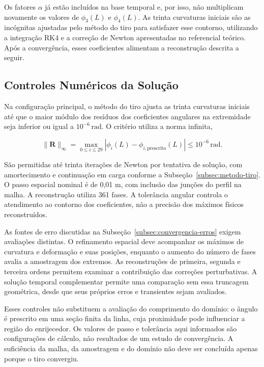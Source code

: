 \documentclass[arial,centeredequations,english,brazilian,oneside,section=TITLE]{ifes8}
\begin{document}
Os fatores $\alpha$ já estão incluídos na base temporal e, por isso, não
multiplicam novamente os valores de $\phi_3(L)$ e $\phi_4(L)$. As trinta
curvaturas iniciais são as incógnitas ajustadas pelo método do tiro para
satisfazer esse contorno, utilizando a integração RK4 e a correção de Newton
apresentadas no referencial teórico. Após a convergência, esses coeficientes
alimentam a reconstrução descrita a seguir.

\subsection{Controles Numéricos da Solução}
\label{sec:controles-numericos}

Na configuração principal, o método do tiro ajusta as trinta curvaturas iniciais
até que o maior módulo dos resíduos dos coeficientes angulares na extremidade
seja inferior ou igual a $10^{-6}\,\mathrm{rad}$. O critério utiliza a norma
infinita,

\begin{equation}
  \|\mathbf R\|_{\infty}=\max_{0\leq i\leq29}
    |\phi_i(L)-\phi_{i,\mathrm{prescrito}}(L)|
    \leq10^{-6}\,\mathrm{rad}.
  \label{eq:tolerancia-angular-tiro}
\end{equation}

São permitidas até trinta iterações de Newton por tentativa de solução, com
amortecimento e continuação em carga conforme a Subseção~\ref{subsec:metodo-tiro}.
O passo espacial nominal é de 0,01 m, com inclusão das junções do perfil na malha.
A reconstrução utiliza 361 fases. A tolerância angular controla o atendimento
ao contorno dos coeficientes, não a precisão dos máximos físicos reconstruídos.

As fontes de erro discutidas na Subseção~\ref{subsec:convergencia-erros} exigem
avaliações distintas. O refinamento espacial deve acompanhar os máximos de
curvatura e deformação e suas posições, enquanto o aumento do número de fases
avalia a amostragem dos extremos. As reconstruções de primeira, segunda e terceira
ordens permitem examinar a contribuição das correções perturbativas. A solução
temporal complementar permite uma comparação sem essa truncagem geométrica,
desde que seus próprios erros e transientes sejam avaliados.

Esses controles não substituem a avaliação do comprimento do domínio:
o ângulo é prescrito em uma seção finita da linha, cuja proximidade pode
influenciar a região do enrijecedor. Os valores de passo e tolerância aqui
informados são configurações de cálculo, não resultados de um estudo de
convergência. A suficiência da malha, da amostragem e do domínio não deve ser
concluída apenas porque o tiro convergiu.
\end{document}
